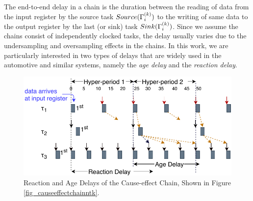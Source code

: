 The end-to-end delay in a chain is the duration between the reading of data from the input register by the source task $Source(\sss{\Gamma})$ to the writing of same data to the output register by the last (or sink) task $Sink(\sss{\Gamma})$. Since we assume the chains consist of independently clocked tasks, the delay usually varies due to the undersampling and oversampling effects in the chains. In this work, we are particularly interested in two types of delays that are widely used in the automotive and similar systems, namely the \textit{age delay} and the \textit{reaction delay}. 
\begin{figure}
	\centering
	\includegraphics[width=0.9\linewidth]{img/timedchain_ntk}
	\caption{Reaction and Age Delays of the Cause-effect Chain, Shown in Figure {\ref{fig_causeeffectchainntk}}.}
	\label{fig_timedchainntk}
\end{figure}


